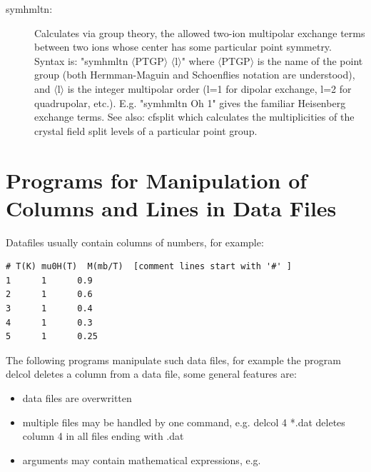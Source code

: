 \begin{description}
\begin{verbatim}
\end{verbatim}      

\item [\prg symhmltn:] Calculates via group theory, the allowed two-ion multipolar exchange terms
between two ions whose center has some particular point symmetry. Syntax is: 
"{\prg symhmltn $\langle$PTGP$\rangle$ $\langle$l$\rangle$}" where {\prg $\langle$PTGP$\rangle$} is 
the name of the point group (both Hermman-Maguin and Schoenflies notation are understood), and 
{\prg $\langle$l$\rangle$} is the integer multipolar order (l=1 for dipolar exchange, l=2 for 
quadrupolar, etc.).
E.g. "{\prg symhmltn Oh 1}" gives the familiar Heisenberg exchange terms. 
See also: {\prg cfsplit} which calculates the multiplicities of the crystal field split levels of a
particular point group.

\end{description} 

\section{Programs for Manipulation of Columns and Lines in Data Files}

Datafiles usually contain columns of numbers, for example:

\begin{verbatim}
# T(K) mu0H(T)  M(mb/T)  [comment lines start with '#' ]
1      1      0.9
2      1      0.6
3      1      0.4
4      1      0.3
5      1      0.25
\end{verbatim}

The following programs manipulate such data files, for example
the program {\prg delcol} deletes a column from a data file,
some general features are:
\begin{itemize}
\item data files are overwritten 
\item multiple files may be handled by one command, e.g. {\prg delcol 4 *.dat} deletes column 4
in all 
files ending with .dat
\item arguments may contain mathematical expressions, e.g. 
\end{itemize}

